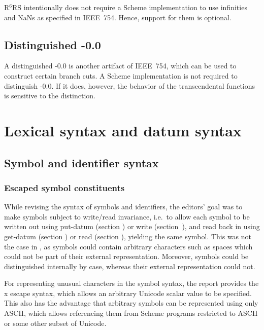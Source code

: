 \documentclass[twoside,twocolumn]{algol60}
\newcommand{\rn}[1]{R$^{#1}$RS}
\begin{document}
\rn{6} intentionally does not require a Scheme implementation to use
infinities and NaNs as specified in IEEE~754.  Hence, support for them
is optional.

\section{Distinguished -0.0}
 
A distinguished -0.0 is another artifact of IEEE~754, which can be
used to construct certain branch cuts.  A Scheme implementation is not
required to distinguish -0.0.  If it does, however, the behavior of
the transcendental functions is sensitive to the distinction.  

\chapter{Lexical syntax and datum syntax}

\section{Symbol and identifier syntax}

\subsection{Escaped symbol constituents}

While revising the syntax of symbols and identifiers, the editors'
goal was to make symbols subject to write/read invariance, i.e.\ to
allow each symbol to be written out using {\cf put-datum} (section
) or {\cf write}
(section~), and
read back in using {\cf get-datum} (section
) or
{\cf read} (section ), yielding the same symbol.  This
was not the case in , as symbols could contain arbitrary
characters such as spaces which could not be part of their external
representation.  Moreover, symbols could be distinguished internally by
case, whereas their external representation could not.

For representing unusual characters in the symbol syntax, the report
provides the {\cf\backwhack{}x} escape syntax, which allows an arbitrary
Unicode scalar value to be specified.  This also has the advantage that
arbitrary symbols can be represented using only ASCII, which allows
referencing them from Scheme programs restricted to ASCII or some
other subset of Unicode.
\end{document}
